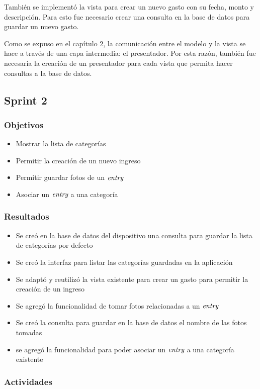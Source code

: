 También se implementó la vista para crear un nuevo gasto con su fecha, monto y descripción. Para esto fue necesario crear una consulta en la base de datos para guardar un nuevo gasto.

Como se expuso en el capítulo 2, la comunicación entre el modelo y la vista se hace a través de una capa intermedia: el presentador. Por esta razón, también fue necesaria la creación de un presentador para cada vista que permita hacer consultas a la base de datos.

\subsection{Sprint 2}

\subsubsection{Objetivos}
\begin{itemize}
\item Mostrar la lista de categorías
\item Permitir la creación de un nuevo ingreso
\item Permitir guardar fotos de un $\textit{entry}$
\item Asociar un $\textit{entry}$ a una categoría
\end{itemize}

\subsubsection{Resultados}
\begin{itemize}
\item Se creó en la base de datos del dispositivo una consulta para guardar la lista de categorías por defecto
\item Se creó la interfaz para listar las categorías guardadas en la aplicación
\item Se adaptó y reutilizó la vista existente para crear un gasto para permitir la creación de un ingreso
\item Se agregó la funcionalidad de tomar fotos relacionadas a un $\textit{entry}$
\item Se creó la consulta para guardar en la base de datos el nombre de las fotos tomadas
\item se agregó la funcionalidad para poder asociar un $\textit{entry}$ a una categoría existente

\end{itemize}

\subsubsection{Actividades}


